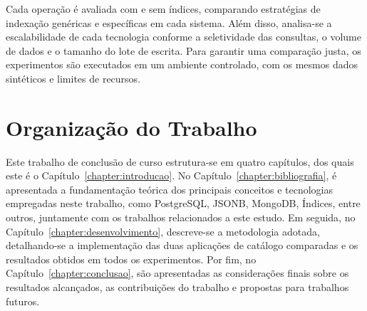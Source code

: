 Cada operação é avaliada com e sem índices, comparando estratégias de indexação genéricas e
específicas em cada sistema. Além disso, analisa-se a escalabilidade de cada tecnologia
conforme a seletividade das consultas, o volume de dados e o tamanho do lote de escrita.
Para garantir uma comparação justa, os experimentos são executados em um ambiente
controlado, com os mesmos dados sintéticos e limites de recursos.

\section{Organização do Trabalho}

Este trabalho de conclusão de curso estrutura-se em quatro capítulos, dos quais este é o Capítulo~\ref{chapter:introducao}. No Capítulo~\ref{chapter:bibliografia}, é apresentada a fundamentação teórica dos principais conceitos e tecnologias empregadas neste trabalho, como PostgreSQL, JSONB, MongoDB, Índices, entre outros, juntamente com os trabalhos relacionados a este estudo. Em seguida, no Capítulo~\ref{chapter:desenvolvimento}, descreve-se a metodologia adotada, detalhando-se a implementação das duas aplicações de catálogo comparadas e os resultados obtidos em todos os experimentos. Por fim, no Capítulo~\ref{chapter:conclusao}, são apresentadas as considerações finais sobre os resultados alcançados, as contribuições do trabalho e propostas para trabalhos futuros.
